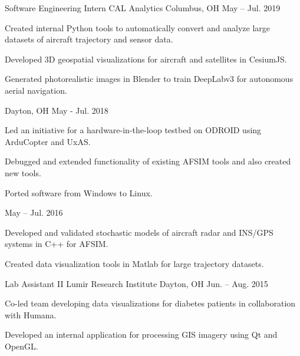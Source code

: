 \begin{cventries}
  \cventry
    {Software Engineering Intern} %
    {CAL Analytics} %
    {Columbus, OH} %
    {May – Jul. 2019} %
    {
      \begin{cvitems} %
        \item {Created internal Python tools to automatically convert and analyze large datasets of aircraft trajectory and sensor data.}
        \item {Developed 3D geospatial visualizations for aircraft and satellites in CesiumJS.}
        \item {Generated photorealistic images in Blender to train DeepLabv3 for autonomous aerial navigation.}
      \end{cvitems}
    }

  \cventry
    {} %
    {} %
    {Dayton, OH} %
    {May - Jul. 2018} %
    {
      \begin{cvitems} %
        \item {Led an initiative for a hardware-in-the-loop testbed on ODROID using ArduCopter and UxAS.}
        \item {Debugged and extended functionality of existing AFSIM tools and also created new tools.}
        \item {Ported software from Windows to Linux.}
      \end{cvitems}
    }

  \cventry
    {} %
    {} %
    {} %
    {May – Jul. 2016} %
    {
      \begin{cvitems} %
        \item {Developed and validated stochastic models of aircraft radar and INS/GPS systems in C++ for AFSIM.}
        \item {Created data visualization tools in Matlab for large trajectory datasets.}
      \end{cvitems}
    }

  \cventry
    {Lab Assistant II} %
    {Lumir Research Institute} %
    {Dayton, OH} %
    {Jun. – Aug. 2015} %
    {
      \begin{cvitems} %
        \item {Co-led team developing data visualizations for diabetes patients in collaboration with Humana.}
        \item {Developed an internal application for processing GIS imagery using Qt and OpenGL.}
      \end{cvitems}
    }


\end{cventries}
